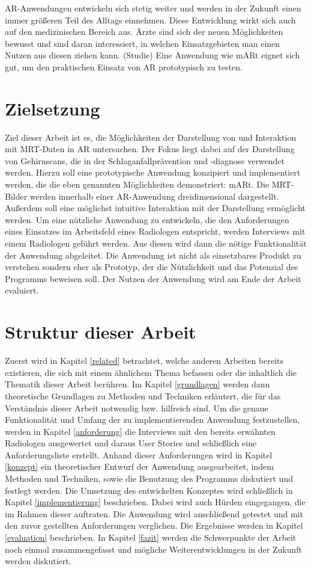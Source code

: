 AR-Anwendungen entwickeln sich stetig weiter und werden in der Zukunft einen immer größeren Teil des Alltags einnehmen. Diese Entwicklung wirkt sich auch auf den medizinischen Bereich aus. 
Ärzte sind sich der neuen Möglichkeiten bewusst und sind daran interessiert, 
in welchen Einsatzgebieten man einen Nutzen aus diesen ziehen kann. (Studie)
Eine Anwendung wie mARt eignet sich gut, um den praktischen Einsatz von AR prototypisch zu testen.

\section{Zielsetzung}

Ziel dieser Arbeit ist es, die Möglichkeiten der Darstellung von und Interaktion mit MRT-Daten in AR untersuchen. Der Fokus liegt dabei auf der Darstellung von Gehirnscans, die in der Schlaganfallprävention und -diagnose verwendet werden.
Hierzu soll eine prototypische Anwendung konzipiert und implementiert werden, die die eben genannten Möglichkeiten demonstriert: mARt.
Die MRT-Bilder werden innerhalb einer AR-Anwendung dreidimensional dargestellt. Außerdem soll eine möglichst intuitive Interaktion mit der Darstellung ermöglicht werden. 
Um eine nützliche Anwendung zu entwickeln, die den Anforderungen eines Einsatzes im Arbeitsfeld eines Radiologen entspricht, werden Interviews mit einem Radiologen geführt werden. Aus diesen wird dann die nötige Funktionalität der Anwendung abgeleitet. 
Die Anwendung ist nicht als einsetzbares Produkt zu verstehen sondern eher als Prototyp, der die Nützlichkeit und das Potenzial des Programms beweisen soll. Der Nutzen der Anwendung wird am Ende der Arbeit evaluiert.


\section{Struktur dieser Arbeit}

Zuerst wird in Kapitel \ref{related} betrachtet, welche anderen Arbeiten bereits existieren, die sich mit einem ähnlichem Thema befassen oder die inhaltlich die Thematik dieser Arbeit berühren. 
Im Kapitel \ref{grundlagen} werden dann theoretische Grundlagen zu Methoden und Techniken erläutert, die für das Verständnis dieser Arbeit notwendig bzw. hilfreich sind.
Um die genaue Funktionalität und Umfang der zu implementierenden Anwendung festzustellen, werden in Kapitel \ref{anforderung} die Interviews mit den bereits erwähnten Radiologen ausgewertet und daraus User Stories und schließlich eine Anforderungsliste erstellt.
Anhand dieser Anforderungen wird in Kapitel \ref{konzept} ein theoretischer Entwurf der Anwendung ausgearbeitet, indem Methoden und Techniken, sowie die Benutzung des Programms diskutiert und festlegt werden.
Die Umsetzung des entwickelten Konzeptes wird schließlich in Kapitel \ref{implementierung} beschrieben. Dabei wird auch Hürden eingegangen, die im Rahmen dieser auftraten.
Die Anwendung wird anschließend getestet und mit den zuvor gestellten Anforderungen verglichen. Die Ergebnisse werden in Kapitel \ref{evaluation} beschrieben. 
In Kapitel \ref{fazit} werden die Schwerpunkte der Arbeit noch einmal zusammengefasst und mögliche Weiterentwicklungen in der Zukunft werden diskutiert. 
 